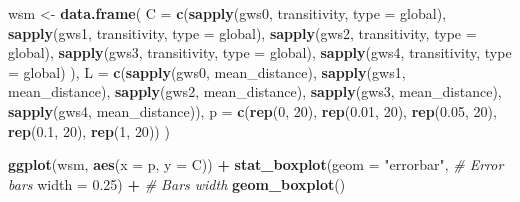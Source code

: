 \documentclass[
]{book}
\newenvironment{Shaded}{\begin{snugshade}}{\end{snugshade}}
\newcommand{\AttributeTok}[1]{\textcolor[rgb]{0.13,0.29,0.53}{#1}}
\newcommand{\CommentTok}[1]{\textcolor[rgb]{0.56,0.35,0.01}{\textit{#1}}}
\newcommand{\DecValTok}[1]{\textcolor[rgb]{0.00,0.00,0.81}{#1}}
\newcommand{\FloatTok}[1]{\textcolor[rgb]{0.00,0.00,0.81}{#1}}
\newcommand{\FunctionTok}[1]{\textcolor[rgb]{0.13,0.29,0.53}{\textbf{#1}}}
\newcommand{\NormalTok}[1]{#1}
\newcommand{\OtherTok}[1]{\textcolor[rgb]{0.56,0.35,0.01}{#1}}
\newcommand{\SpecialCharTok}[1]{\textcolor[rgb]{0.81,0.36,0.00}{\textbf{#1}}}
\newcommand{\StringTok}[1]{\textcolor[rgb]{0.31,0.60,0.02}{#1}}
\begin{document}
\begin{Shaded}
\begin{Highlighting}[]
\NormalTok{wsm }\OtherTok{\textless{}{-}} \FunctionTok{data.frame}\NormalTok{(}
  \AttributeTok{C =} \FunctionTok{c}\NormalTok{(}\FunctionTok{sapply}\NormalTok{(gws0, transitivity, }\AttributeTok{type =} \StringTok{\textquotesingle{}global\textquotesingle{}}\NormalTok{),}
        \FunctionTok{sapply}\NormalTok{(gws1, transitivity, }\AttributeTok{type =} \StringTok{\textquotesingle{}global\textquotesingle{}}\NormalTok{),}
        \FunctionTok{sapply}\NormalTok{(gws2, transitivity, }\AttributeTok{type =} \StringTok{\textquotesingle{}global\textquotesingle{}}\NormalTok{),}
        \FunctionTok{sapply}\NormalTok{(gws3, transitivity, }\AttributeTok{type =} \StringTok{\textquotesingle{}global\textquotesingle{}}\NormalTok{),}
        \FunctionTok{sapply}\NormalTok{(gws4, transitivity, }\AttributeTok{type =} \StringTok{\textquotesingle{}global\textquotesingle{}}\NormalTok{)}
\NormalTok{        ),}
  \AttributeTok{L =} \FunctionTok{c}\NormalTok{(}\FunctionTok{sapply}\NormalTok{(gws0, mean\_distance),}
        \FunctionTok{sapply}\NormalTok{(gws1, mean\_distance),}
        \FunctionTok{sapply}\NormalTok{(gws2, mean\_distance),}
        \FunctionTok{sapply}\NormalTok{(gws3, mean\_distance),}
        \FunctionTok{sapply}\NormalTok{(gws4, mean\_distance)),}
  \AttributeTok{p =} \FunctionTok{c}\NormalTok{(}\FunctionTok{rep}\NormalTok{(}\StringTok{\textquotesingle{}0\textquotesingle{}}\NormalTok{, }\DecValTok{20}\NormalTok{), }\FunctionTok{rep}\NormalTok{(}\StringTok{\textquotesingle{}0.01\textquotesingle{}}\NormalTok{, }\DecValTok{20}\NormalTok{), }\FunctionTok{rep}\NormalTok{(}\StringTok{\textquotesingle{}0.05\textquotesingle{}}\NormalTok{, }\DecValTok{20}\NormalTok{), }\FunctionTok{rep}\NormalTok{(}\StringTok{\textquotesingle{}0.1\textquotesingle{}}\NormalTok{, }\DecValTok{20}\NormalTok{), }\FunctionTok{rep}\NormalTok{(}\StringTok{\textquotesingle{}1\textquotesingle{}}\NormalTok{, }\DecValTok{20}\NormalTok{))}
\NormalTok{)}

\FunctionTok{ggplot}\NormalTok{(wsm, }\FunctionTok{aes}\NormalTok{(}\AttributeTok{x =}\NormalTok{ p, }\AttributeTok{y =}\NormalTok{ C)) }\SpecialCharTok{+}
  \FunctionTok{stat\_boxplot}\NormalTok{(}\AttributeTok{geom =} \StringTok{"errorbar"}\NormalTok{, }\CommentTok{\# Error bars}
               \AttributeTok{width =} \FloatTok{0.25}\NormalTok{) }\SpecialCharTok{+}    \CommentTok{\# Bars width}
  \FunctionTok{geom\_boxplot}\NormalTok{()}
\end{Highlighting}
\end{Shaded}
\end{document}
